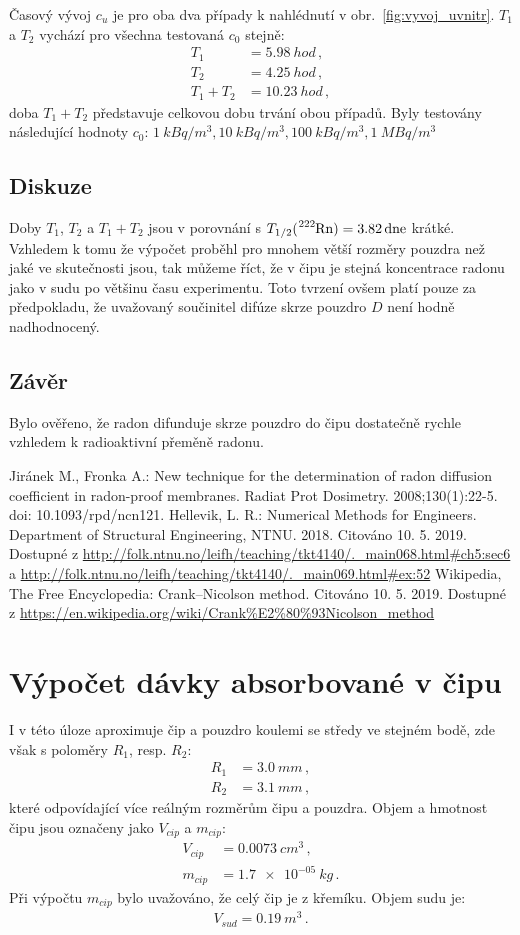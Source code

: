 \documentclass[11pt,a4paper]{article}
\begin{document}
Časový vývoj $c_u$ je pro oba dva případy k nahlédnutí v obr.~\ref{fig:vyvoj_uvnitr}. $T_1$ a $T_2$ vychází pro všechna testovaná $c_0$ stejně:
\begin{align}
	T_1&=\SI{5,98}{hod}\,,\\
	T_2&=\SI{4,25}{hod}\,,\\
	T_1+T_2&=\SI{10,23}{hod}\,,
\end{align}
doba $T_1+T_2$ představuje celkovou dobu trvání obou případů. Byly testovány následující hodnoty $c_0$: $\SI{1}{kBq/m^3}, \SI{10}{kBq/m^3}, \SI{100}{kBq/m^3}, \SI{1}{MBq/m^3}$
\subsection{Diskuze}
Doby $T_1$, $T_2$ a $T_1+T_2$ jsou v porovnání s $T_{1/2}(\ce{^{222}Rn})=\SI{3,82}{dne}$ krátké. Vzhledem k tomu že výpočet proběhl pro mnohem větší rozměry pouzdra než jaké ve skutečnosti jsou, tak můžeme říct, že v čipu je stejná koncentrace radonu jako v sudu po většinu času experimentu. Toto tvrzení ovšem platí pouze za předpokladu, že uvažovaný součinitel difúze skrze pouzdro $D$ není hodně nadhodnocený.
\subsection{Závěr}
Bylo ověřeno, že radon difunduje skrze pouzdro do čipu dostatečně rychle vzhledem k radioaktivní přeměně radonu.
\begin{thebibliography}{Mm99}
	 Jiránek M., Fronka A.: New technique for the determination of radon diffusion coefficient in radon-proof membranes. Radiat Prot Dosimetry. 2008;130(1):22-5. doi: 10.1093/rpd/ncn121.
	 Hellevik, L. R.: Numerical Methods for Engineers. Department of Structural Engineering, NTNU. 2018. Citováno 10. 5. 2019. Dostupné z \url{http://folk.ntnu.no/leifh/teaching/tkt4140/._main068.html#ch5:sec6} a \url{http://folk.ntnu.no/leifh/teaching/tkt4140/._main069.html#ex:52}
	 Wikipedia, The Free Encyclopedia: Crank–Nicolson method. Citováno 10. 5. 2019. Dostupné z \url{https://en.wikipedia.org/wiki/Crank%E2%80%93Nicolson_method}
	\end{thebibliography}
\section{Výpočet dávky absorbované v čipu}
I v této úloze aproximuje čip a pouzdro koulemi se středy ve stejném bodě, zde však s poloměry $R_1$, resp. $R_2$:
\begin{align}
	R_1&=\SI{3,0}{mm}\,,\\
	R_2&=\SI{3,1}{mm}\,,
\end{align}
které odpovídající více reálným rozměrům čipu a pouzdra. Objem a hmotnost čipu jsou označeny jako $V_{cip}$ a $m_{cip}$:
\begin{align}
	V_{cip}&=\SI{0,0073}{cm^3}\,,\\
	m_{cip}&=\SI{1.7e-05}{kg}\,.
\end{align}
Při výpočtu $m_{cip}$ bylo uvažováno, že celý čip je z křemíku. Objem sudu je:
\begin{align}
	V_{sud}=\SI{0,19}{m^3}\,.
\end{align}
\end{document}
